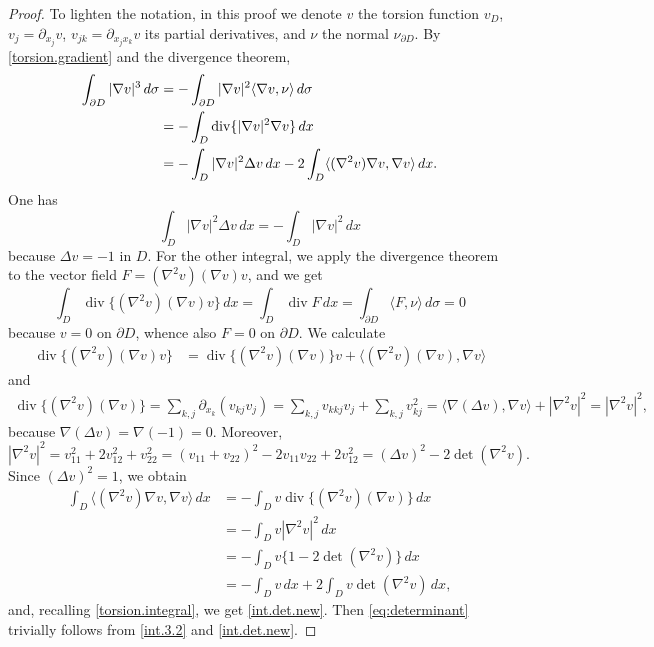 \documentclass[10pt,reqno,a4paper]{article}
\numberwithin{equation}{section}
\theoremstyle{plain}
\theoremstyle{definition}
\newcommand{\la}{\langle}
\newcommand{\ra}{\rangle}
\newcommand{\pa}{\partial}
\renewcommand{\div}{\operatorname{div}} %
\newcommand{\grad}{\nabla}
\begin{document}
\begin{proof} 
To lighten the notation, in this proof we denote $v$ the torsion function $v_D$, 
$v_j = \pa_{x_j} v$, $v_{jk} = \pa_{x_j x_k} v$ its partial derivatives,
and $\nu$ the normal $\nu_{\pa D}$.
By \eqref{torsion.gradient} and the divergence theorem, 
\begin{align}
\int_{\pa D} |\nabla v|^3\, d\sigma 
& = - \int_{\pa D} |\grad v|^2 \la \grad v, \nu \ra \, d\sigma
\notag \\ 
& = - \int_D \div \{ |\grad v|^2 \grad v \} \,dx
\notag \\ & 
= - \int_D |\grad v|^2 \Delta v \, dx 
- 2 \int_D \la (\grad^2 v) \grad v , \grad v \ra \, dx.
\label{int.3.2}
\end{align}
One has 
\[
\int_D |\grad v|^2 \Delta v \, dx 
= - \int_D |\grad v|^2 \, dx 
\]
because $\Delta v = -1$ in $D$. 
For the other integral, we apply the divergence theorem to the vector field 
$F = (\grad^2 v)(\grad v) v$, and we get 
\[
\int_D \div \{ (\grad^2 v)(\grad v) v \} \, dx 
= \int_D \div F \, dx 
= \int_{\pa D} \la F, \nu \ra \, d\sigma 
= 0
\]
because $v = 0$ on $\pa D$, whence also $F = 0$ on $\pa D$.
We calculate 
\begin{align*}
\div \{ (\grad^2 v)(\grad v) v \} 
& = \div \{ (\grad^2 v)(\grad v) \} v + \la (\grad^2 v)(\grad v) , \grad v \ra
\end{align*}
and 
\begin{align*}
\div \{ (\grad^2 v)(\grad v) \} 
= \sum_{k,j} \pa_{x_k} (v_{kj} v_j) 
= \sum_{k,j} v_{kkj} v_j + \sum_{k,j} v_{kj}^2
= \la \grad ( \Delta v) , \grad v \ra + |\grad^2 v|^2 
= |\grad^2 v|^2, 
\end{align*}
because $\grad (\Delta v) = \grad (-1) = 0$. Moreover, 
\[
|\grad^2 v|^2 
= v_{11}^2 + 2 v_{12}^2 + v_{22}^2
= (v_{11} + v_{22})^2 - 2 v_{11} v_{22} + 2 v_{12}^2
= (\Delta v)^2 - 2 \det(\grad^2 v).
\]
Since $(\Delta v)^2 = 1$, we obtain 
\begin{align*}
\int_D \la (\grad^2 v) \grad v , \grad v \ra \, dx
& = - \int_D v \div \{ (\grad^2 v)(\grad v) \} \, dx 
\\ 
& = - \int_D v |\grad^2 v|^2 \, dx 
\\ 
& = - \int_D v \{ 1 - 2 \det(\grad^2 v) \} \, dx 
\\ 
& = - \int_D v \, dx + 2 \int_D v \det(\grad^2 v) \, dx, 
\end{align*}
and, recalling \eqref{torsion.integral}, we get \eqref{int.det.new}.
Then \eqref{eq:determinant} trivially follows from \eqref{int.3.2} and \eqref{int.det.new}.
\end{proof}
\end{document}
